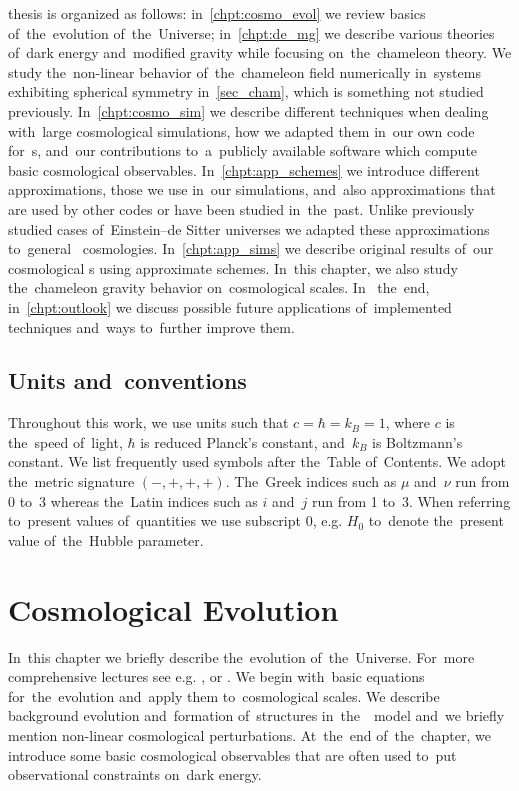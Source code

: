 \DIFdelend thesis is organized as follows: in~\autoref{chpt:cosmo_evol} we review basics of~the~evolution of~the~Universe; in~\autoref{chpt:de_mg} we describe various theories of~dark energy and~modified gravity while focusing on~the~chameleon theory. We study the~non-linear behavior of~the~chameleon field numerically in~systems exhibiting spherical symmetry in~\autoref{sec_cham}, which is something not studied previously. In~\autoref{chpt:cosmo_sim} we describe different techniques when dealing with~large cosmological simulations, how we adapted them in~our own code for~\nbodysim s, and~our contributions to~a~publicly available software  which compute basic cosmological observables. In~\autoref{chpt:app_schemes} we introduce different approximations, those we use in~our simulations, and~also approximations that are used by other codes or have been studied in~the~past. Unlike previously studied cases of~Einstein--de Sitter universes we adapted these approximations to~general \LCDM\ cosmologies. In~\autoref{chpt:app_sims} we describe original results of~our cosmological \nbodysim s using approximate schemes. In~this chapter, we also study the~chameleon gravity behavior on~cosmological scales. 
In~\DIFdelbegin %
\DIFdelend the~end, in~\autoref{chpt:outlook} we discuss possible future applications of~implemented techniques and~ways to~further improve them.

\section*{Units and~conventions}
Throughout this work, we use units such that $c=\hbar=k_B=1$, where $c$ is the~speed of~light, $\hbar$ is reduced Planck's constant, and~$k_B$ is Boltzmann's constant. We list frequently used symbols after the~Table of~Contents. We adopt the~metric signature $(-, +, +, +)$. The~Greek indices such as $\mu$ and~$\nu$ run from 0 to~3 whereas the~Latin indices such as $i$ and~$j$ run from 1 to~3. When referring to~present values of~quantities we use subscript $0$, e.g. $H_0$ to~denote the~present value of~the~Hubble parameter.\clearpage{}
\clearpage{}\chapter{Cosmological Evolution}
\label{chpt:cosmo_evol}
In~this chapter we briefly describe the~evolution of~the~Universe. For~more comprehensive lectures see e.g. \textcite{Ref:Weinberg}, \textcite{2002col.luc..cosmology} or \textcite{2010deto.book.....A}. We begin with~basic equations for~the~evolution and~apply them to~cosmological scales. We describe background evolution and~formation of~structures in~the~\LCDM\ model and~we briefly mention non-linear cosmological perturbations. At~the~end of~the~chapter, we introduce some basic cosmological observables that are often used to~put observational constraints on~dark energy.

